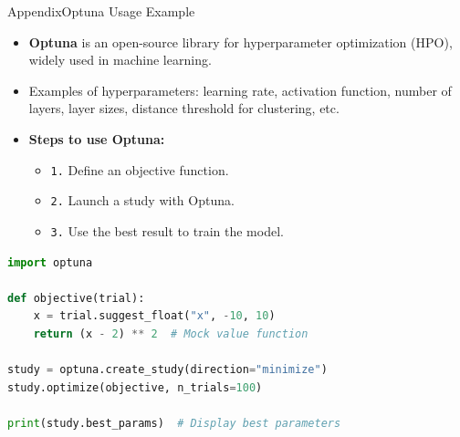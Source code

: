 \begin{frame}[fragile]{Appendix}{Optuna Usage Example}
    \begin{itemize}
        \item \textbf{Optuna} is an open-source library for hyperparameter optimization (HPO), widely used in machine learning.
        \item Examples of hyperparameters: learning rate, activation function, number of layers, layer sizes, distance threshold for clustering, etc.
        \item \textbf{Steps to use Optuna:}
              \begin{itemize}
                  \item \texttt{1.} Define an objective function.
                  \item \texttt{2.} Launch a study with Optuna.
                  \item \texttt{3.} Use the best result to train the model.
              \end{itemize}
    \end{itemize}

    \begin{lstlisting}[language=Python, basicstyle=\small\ttfamily, frame=single, caption=Optuna example in Python]
import optuna

def objective(trial):
    x = trial.suggest_float("x", -10, 10)
    return (x - 2) ** 2  # Mock value function

study = optuna.create_study(direction="minimize")
study.optimize(objective, n_trials=100)

print(study.best_params)  # Display best parameters
    \end{lstlisting}
\end{frame}

